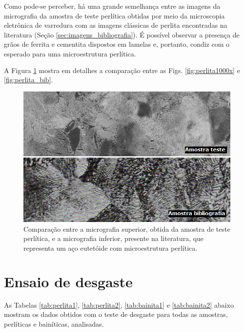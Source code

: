 \documentclass[
12pt,
openany, %
oneside, %
a4paper,			
english,			
brazil			        %
]{abntbibufjf}
\begin{document}
	Como pode-se perceber, há uma grande semelhança entre as imagens da micrografia da amostra de teste perlítica obtidas por meio da microscopia eletrônica de varredura com as imagens clássicas de perlita encontradas na literatura (Seção \ref{sec:imagens_bibliografia}). É possível observar a presença de grãos de ferrita e cementita dispostos em lamelas e, portanto, condiz com o esperado para uma microestrutura perlítica. 
	
	A Figura \ref{fig:comparacao_perlita} mostra em detalhes a comparação entre as Figs. \ref{fig:perlita1000x} e \ref{fig:perlita_bib}.

\begin{figure}[H]
	\centering
	\includegraphics[width=1\textwidth]{comparacao_perlita}
	\caption{Comparação entre a micrografia superior, obtida da amostra de teste perlítica, e a micrografia inferior, presente na literatura, que representa um aço eutetóide com microestrutura perlítica.}
	\label{fig:comparacao_perlita}
\end{figure}


\pagebreak
\section{Ensaio de desgaste}
\label{sec:ensaio_desgaste}

	As Tabelas \ref{tab:perlita1}, \ref{tab:perlita2}, \ref{tab:bainita1} e \ref{tab:bainita2} abaixo mostram os dados obtidos com o teste de desgaste para todas as amostras, perlíticas e bainíticas, analisadas.
\end{document}
